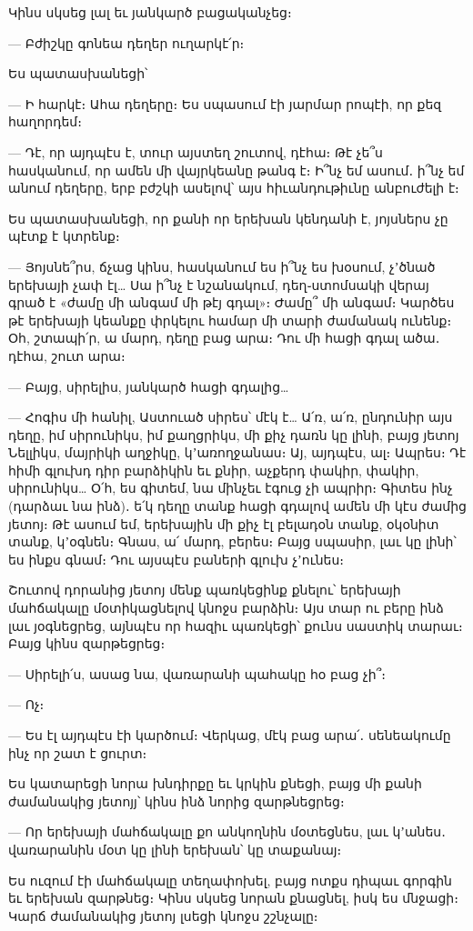 Կինս սկսեց լալ եւ յանկարծ բացականչեց։

— Բժիշկը գոնեա դեղեր ուղարկէ՛ր։

Ես պատասխանեցի՝

— Ի հարկէ։ Ահա դեղերը։ Ես սպասում էի յարմար րոպէի, որ քեզ հաղորդեմ։

— Դէ, որ այդպէս է, տուր այստեղ շուտով, դէհա։ Թէ չե՞ս հասկանում, որ ամեն մի վայրկեանը թանգ է։ Ի՞նչ եմ ասում․ ի՞նչ եմ անում դեղերը, երբ բժշկի ասելով՝ այս հիւանդութիւնը անբուժելի է։

Ես պատասխանեցի, որ քանի որ երեխան կենդանի է, յոյսներս չը պէտք է կտրենք։

— Յոյսնե՞րս, ճչաց կինս, հասկանում ես ի՞նչ ես խօսում, չʼծնած երեխայի չափ էլ… Սա ի՞նչ է նշանակում, դեղ֊ստոմսակի վերայ գրած է «ժամը մի անգամ մի թէյ գդալ»։ Ժամը՞ մի անգամ։ Կարծես թէ երեխայի կեանքը փրկելու համար մի տարի ժամանակ ունենք։ Օհ, շտապի՛ր, ա մարդ, դեղը բաց արա։ Դու մի հացի գդալ ածա․ դէհա, շուտ արա։

— Բայց, սիրելիս, յանկարծ հացի գդալից…

— Հոգիս մի հանիլ, Աստուած սիրես՝ մէկ է… Ա՛ռ, ա՛ռ, ընդունիր այս դեղը, իմ սիրունիկս, իմ քաղցրիկս, մի քիչ դառն կը լինի, բայց յետոյ Նելլիկս, մայրիկի աղջիկը, կʼառողջանաս։ Այ, այդպէս, ալ։ Ապրես։ Դէ հիմի գլուխդ դիր բարձիկին եւ քնիր, աչքերդ փակիր, փակիր, սիրունիկս… Օ՛հ, ես գիտեմ, նա մինչեւ էգուց չի ապրիր։ Գիտես ինչ (դարձաւ նա ինձ)․ ե՛կ դեղը տանք հացի գդալով ամեն մի կէս ժամից յետոյ։ Թէ ասում եմ, երեխային մի քիչ էլ բելադօն տանք, օկօնիտ տանք, կʼօգնեն։ Գնաս, ա՛ մարդ, բերես։ Բայց սպասիր, լաւ կը լինի՝ ես ինքս գնամ։ Դու այսպէս բաների գլուխ չʼունես։

Շուտով դորանից յետոյ մենք պառկեցինք քնելու՝ երեխայի մահճակալը մօտիկացնելով կնոջս բարձին։ Այս տար ու բերը ինձ լաւ յօգնեցրեց, այնպէս որ հազիւ պառկեցի՝ քունս սաստիկ տարաւ։ Բայց կինս զարթեցրեց։

— Սիրելի՛ս, ասաց նա, վառարանի պահակը հօ բաց չի՞։

— Ոչ։

— Ես էլ այդպէս էի կարծում։ Վերկաց, մէկ բաց արա՛․ սենեակումը ինչ որ շատ է ցուրտ։

Ես կատարեցի նորա խնդիրքը եւ կրկին քնեցի, բայց մի քանի ժամանակից յետոյյ՝ կինս ինձ նորից զարթնեցրեց։

— Որ երեխայի մահճակալը քո անկողնին մօտեցնես, լաւ կʼանես․ վառարանին մօտ կը լինի երեխան՝ կը տաքանայ։

Ես ուզում էի մահճակալը տեղափոխել, բայց ոտքս դիպաւ գորգին եւ երեխան զարթնեց։ Կինս սկսեց նորան քնացնել, իսկ ես մնջացի։ Կարճ ժամանակից յետոյ լսեցի կնոջս շշնչալը։

